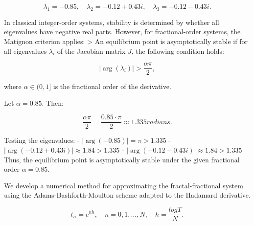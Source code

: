 \documentclass[10pt]{NSP1}
\begin{document}
\[
\lambda_{1} = - 0.85,\quad\lambda_{2} = - 0.12 + 0.43i,\quad\lambda_{3} = - 0.12 - 0.43i.
\]

\par\medskip{}\smallskip

In classical integer-order systems, stability is determined by whether all eigenvalues have negative real parts. However, for fractional-order systems, the Matignon criterion applies: \textgreater{} An equilibrium point is asymptotically stable if for all eigenvalues \(\lambda_{i}\) of the Jacobian matrix \(J\), the following condition holds:

\[
\left| \arg\left( \lambda_{i} \right) \right| > \frac{\alpha\pi}{2},
\]

where \(\alpha \in (0,1\rbrack\) is the fractional order of the derivative.

Let \(\alpha = 0.85\). Then:

\[
\frac{\alpha\pi}{2} = \frac{0.85 \cdot \pi}{2} \approx 1.335radians.
\]

Testing the eigenvalues: - \(\left| \arg( - 0.85) \right| = \pi > 1.335\) - \(\left| \arg( - 0.12 + 0.43i) \right| \approx 1.84 > 1.335\) - \(\left| \arg( - 0.12 - 0.43i) \right| \approx 1.84 > 1.335\) Thus, the equilibrium point is asymptotically stable under the given fractional order \(\alpha = 0.85\).

\par\medskip{}\smallskip

We develop a numerical method for approximating the fractal-fractional system using the Adams-Bashforth-Moulton scheme adapted to the Hadamard derivative.

\par\vspace{9.0pt}\vspace{9.0pt}

\[
t_{n} = e^{nh},\quad n = 0,1,...,N,\quad h = \frac{logT}{N}.
\]

\par\vspace{9.0pt}\vspace{9.0pt}
\end{document}
